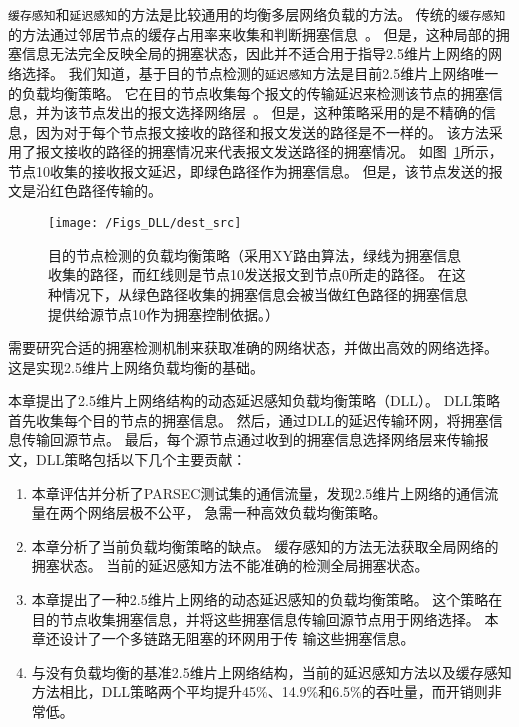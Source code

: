 \texttt{缓存感知}和\texttt{延迟感知}的方法是比较通用的均衡多层网络负载的方法。
传统的\texttt{缓存感知}的方法通过邻居节点的缓存占用率来收集和判断拥塞信息~。
但是，这种局部的拥塞信息无法完全反映全局的拥塞状态，因此并不适合用于指导2.5维片上网络的网络选择。
我们知道，基于目的节点检测的\texttt{延迟感知}方法是目前2.5维片上网络唯一的负载均衡策略。
它在目的节点收集每个报文的传输延迟来检测该节点的拥塞信息，并为该节点发出的报文选择网络层~。
但是，这种策略采用的是不精确的信息，因为对于每个节点报文接收的路径和报文发送的路径是不一样的。
该方法采用了报文接收的路径的拥塞情况来代表报文发送路径的拥塞情况。
如图~\ref{fig:dest_src}所示，节点10收集的接收报文延迟，即绿色路径作为拥塞信息。
但是，该节点发送的报文是沿红色路径传输的。

\begin{figure}[htbp] %
  \centering
  \texttt{[image: /Figs\_DLL/dest\_src]}
  \caption{目的节点检测的负载均衡策略（采用XY路由算法，绿线为拥塞信息收集的路径，而红线则是节点10发送报文到节点0所走的路径。
  在这种情况下，从绿色路径收集的拥塞信息会被当做红色路径的拥塞信息提供给源节点10作为拥塞控制依据。）}
  \label{fig:dest_src}
\end{figure}

需要研究合适的拥塞检测机制来获取准确的网络状态，并做出高效的网络选择。
这是实现2.5维片上网络负载均衡的基础。

本章提出了2.5维片上网络结构的动态延迟感知负载均衡策略（DLL）。
DLL策略首先收集每个目的节点的拥塞信息。
然后，通过DLL的延迟传输环网，将拥塞信息传输回源节点。
最后，每个源节点通过收到的拥塞信息选择网络层来传输报文，DLL策略包括以下几个主要贡献：
\renewcommand*\theenumi{(\alph{enumi})}
\begin{enumerate}
\setlength\itemsep{1pt}
\item 本章评估并分析了PARSEC测试集的通信流量，发现2.5维片上网络的通信流量在两个网络层极不公平，
急需一种高效负载均衡策略。

\item 本章分析了当前负载均衡策略的缺点。
缓存感知的方法无法获取全局网络的拥塞状态。
当前的延迟感知方法不能准确的检测全局拥塞状态。

\item 本章提出了一种2.5维片上网络的动态延迟感知的负载均衡策略。
这个策略在目的节点收集拥塞信息，并将这些拥塞信息传输回源节点用于网络选择。
本章还设计了一个多链路无阻塞的环网用于传 输这些拥塞信息。

\item 与没有负载均衡的基准2.5维片上网络结构，当前的延迟感知方法以及缓存感知方法相比，DLL策略两个平均提升45\%、14.9\%和6.5\%的吞吐量，而开销则非常低。
\end{enumerate}


